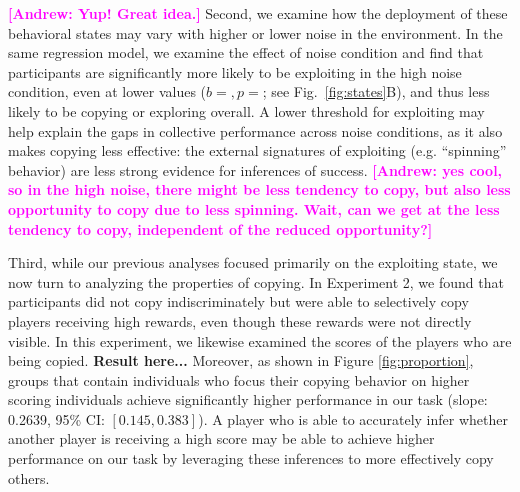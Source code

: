 \documentclass[12pt,letterpaper]{article}
\newcommand{\andrew}[1]{\textcolor{magenta}{\bf [Andrew: #1]}}
\begin{document}


\andrew{Yup! Great idea.}
Second, we examine how the deployment of these behavioral states may vary with higher or lower noise in the environment. 
In the same regression model, we examine the effect of noise condition and find that participants are significantly more likely to be exploiting in the high noise condition, even at lower values ($b=, p=$; see Fig.~\ref{fig:states}B), and thus less likely to be copying or exploring overall.
A lower threshold for exploiting may help explain the gaps in collective performance across noise conditions, as it also makes copying less effective: the external signatures of exploiting (e.g. ``spinning'' behavior) are less strong evidence for inferences of success. \andrew{yes cool, so in the high noise, there might be less tendency to copy, but also less opportunity to copy due to less spinning.  Wait, can we get at the less tendency to copy, independent of the reduced opportunity?}

Third, while our previous analyses focused primarily on the exploiting state, we now turn to analyzing the properties of copying. 
In Experiment 2, we found that participants did not copy indiscriminately but were able to selectively copy players receiving high rewards, even though these rewards were not directly visible. 
In this experiment, we likewise examined the scores of the players who are being copied.
\textbf{Result here...}
Moreover, as shown in Figure \ref{fig:proportion}, groups that contain individuals who focus their copying behavior on higher scoring individuals achieve significantly higher performance in our task (slope: 0.2639, 95\% CI: $[0.145,  0.383]$). 
A player who is able to accurately infer whether another player is receiving a high score may be able to achieve higher performance on our task by leveraging these inferences to more effectively copy others.
\end{document}
